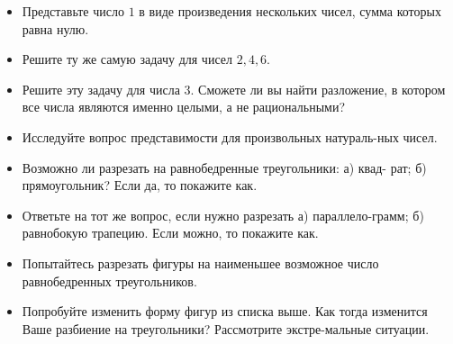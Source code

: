 ﻿

\begin{itemize}
\item Представьте число $1$ в виде произведения нескольких чисел, сумма которых равна нулю.
\item Решите ту же самую задачу для чисел $2,4,6$.
\item Решите эту задачу для числа $3$. Сможете ли вы найти разложение, в котором все числа являются именно целыми, а не рациональными?
\item Исследуйте вопрос представимости для произвольных натураль-\linebreak ных чисел.
\end{itemize}


\begin{itemize}
\item Возможно ли разрезать на равнобедренные треугольники: а) квад- рат; б) прямоугольник? Если да, то покажите как.
\item Ответьте на тот же вопрос, если нужно разрезать а) параллело-\linebreak грамм; б) равнобокую трапецию. Если можно, то покажите как.
\item Попытайтесь разрезать фигуры на наименьшее возможное число равнобедренных треугольников.
\item Попробуйте изменить форму фигур из списка выше. Как тогда изменится Ваше разбиение на треугольники? Рассмотрите экстре-\linebreak мальные ситуации.
\end{itemize}